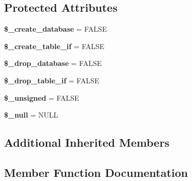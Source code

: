\subsection*{Protected Attributes}
\begin{DoxyCompactItemize}
\item 
\mbox{\label{class_c_i___d_b__oci8__forge_abda15418eb5e498e54eaf79e1724638d}} 
{\bfseries \$\+\_\+create\+\_\+database} = F\+A\+L\+SE
\item 
\mbox{\label{class_c_i___d_b__oci8__forge_a356dbf0e770d89fa1f5fb257a6924aa0}} 
{\bfseries \$\+\_\+create\+\_\+table\+\_\+if} = F\+A\+L\+SE
\item 
\mbox{\label{class_c_i___d_b__oci8__forge_aa3df52a0fd35cff6b47721cc91b195d2}} 
{\bfseries \$\+\_\+drop\+\_\+database} = F\+A\+L\+SE
\item 
\mbox{\label{class_c_i___d_b__oci8__forge_a2b43b9538273396e700a0a0579f9fd63}} 
{\bfseries \$\+\_\+drop\+\_\+table\+\_\+if} = F\+A\+L\+SE
\item 
\mbox{\label{class_c_i___d_b__oci8__forge_a9541512cd1cadd583aae2bb9cc0d52ab}} 
{\bfseries \$\+\_\+unsigned} = F\+A\+L\+SE
\item 
\mbox{\label{class_c_i___d_b__oci8__forge_a62915be380583b49c5e2a634cfad5c89}} 
{\bfseries \$\+\_\+null} = \textquotesingle{}N\+U\+LL\textquotesingle{}
\end{DoxyCompactItemize}
\subsection*{Additional Inherited Members}


\subsection{Member Function Documentation}
\mbox{\label{class_c_i___d_b__oci8__forge_ad539733a69b99fc60bc16eeb4008470b}} 
